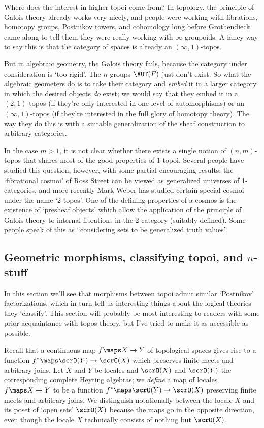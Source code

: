 \documentclass{amsart}
\begin{document}
Where does the interest in higher topoi come from?  In topology, the
principle of Galois theory already works very nicely, and people were
working with fibrations, homotopy groups, Postnikov towers, and
cohomology long before Grothendieck came along to tell them they were
really working with $\infty$-groupoids.  A fancy way to say this is
that the category of spaces is already an $(\infty,1)$-topos.

But in algebraic geometry, the Galois theory fails, because the
category under consideration is `too rigid'.  The $n$-groups $\AUT(F)$
just don't exist.  So what the algebraic geometers do is to take their
category and \emph{embed} it in a larger category in which the desired
objects \emph{do} exist; we would say that they embed it in a
$(2,1)$-topos (if they're only interested in one level of
automorphisms) or an $(\infty,1)$-topos (if they're interested in the
full glory of homotopy theory).  The way they do this is with a
suitable generalization of the sheaf construction to arbitrary
categories.

In the case $m>1$, it is not clear whether there exists a single
notion of $(n,m)$-topos that shares most of the good properties of
$1$-topoi.  Several people have studied this question, however, with
some partial encouraging results; the `fibrational cosmoi' of Ross
Street can be viewed as generalized universes of 1-categories, and
more recently Mark Weber has studied certain special cosmoi under the
name `2-topos'.  One of the defining properties of a cosmos is the
existence of `presheaf objects' which allow the application of the
principle of Galois theory to internal fibrations in the 2-category
(suitably defined).  Some people speak of this as ``considering sets
to be generalized truth values''.



\subsection{Geometric morphisms, classifying topoi, and $n$-stuff}
\label{sec:geom-morph}

In this section we'll see that morphisms between topoi admit similar
`Postnikov' factorizations, which in turn tell us interesting things
about the logical theories they `classify'.  This section will
probably be most interesting to readers with some prior acquaintance
with topos theory, but I've tried to make it as accessible as
possible.

Recall that a continuous map $f\maps X\to Y$ of topological spaces
gives rise to a function $f^*\maps \scrO(Y)\to \scrO(X)$ which
preserves finite meets and arbitrary joins.  Let $X$ and $Y$ be
locales and $\scrO(X)$ and $\scrO(Y)$ the corresponding complete
Heyting algebras; we \emph{define} a map of locales $f\maps X\to Y$ to
be a function $f^*\maps \scrO(Y)\to \scrO(X)$ preserving finite meets
and arbitrary joins.  We distinguish notationally between the locale
$X$ and its poset of `open sets' $\scrO(X)$ because the maps go in the
opposite direction, even though the locale $X$ technically consists of
nothing but $\scrO(X)$.
\end{document}
